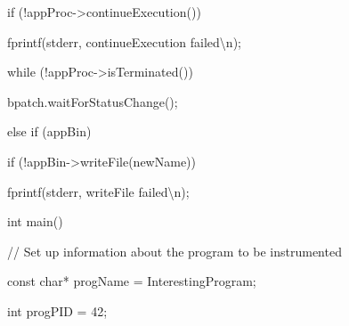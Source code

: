 {{{{{{{

if (!appProc->continueExecution()) {}



{

fprintf(stderr, {\textquotedbl}continueExecution failed{\textbackslash}n{\textquotedbl});}



{

}}



{

while (!appProc->isTerminated()) {}



{

bpatch.waitForStatusChange();}



{

}}



{

} else if (appBin) {}



{

if (!appBin->writeFile(newName)) {}



{

fprintf(stderr, {\textquotedbl}writeFile failed{\textbackslash}n{\textquotedbl});}



{

}}



{

}}



{

}}





\bigskip



{

int main() {}



{

// Set up information about the program to be instrumented}



{

const char* progName = {\textquotedbl}InterestingProgram{\textquotedbl};}



{

int progPID = 42;}



}}}}}
